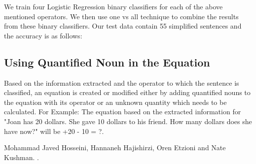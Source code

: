 \documentclass[11pt]{article}
\begin{document}
We train four Logistic Regression binary classifiers for each of the above mentioned operators. We then use one vs all technique to combine the results from these binary classifiers. Our test data contain 55 simplified sentences and the accuracy is as follows:


\subsection{Using Quantified Noun in the Equation}
Based on the information extracted and the operator to which the sentence is classified, an equation is created or modified either by adding quantified nouns to the equation with its operator or an unknown quantity which needs to be calculated. For Example: The equation based on the extracted information for "Joan has 20 dollars. She gave 10 dollars to his friend. How many dollars does she have now?" will be +20 - 10 = ?.

\begin{thebibliography}{}
  
  Mohammad Javed Hosseini, Hannaneh Hajishirzi, Oren Etzioni and Nate Kushman.
  .
  
\end{thebibliography}
\end{document}
